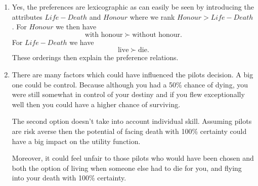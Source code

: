\documentclass[a4paper]{article}
\begin{document}
\begin{exercise}{9}
\begin{enumerate}[label=(\alph*)]
      \item Yes, the preferences are lexicographic as can easily be seen by introducing the attributes $ Life-Death $ and $ Honour $ where we rank $ Honour > Life-Death $. For $ Honour $ we then have
        \begin{equation*}
          \text{with honour} \succ \text{without honour}
        .\end{equation*}
        For $ Life-Death $ we have
        \begin{equation*}
          \text{live} \succ \text{die}
        .\end{equation*}
        These orderings then explain the preference relations.

      \item There are many factors which could have influenced the pilots decision. A big one could be control. Because although you had a 50\% chance of dying, you were still somewhat in control of your destiny and if you flew exceptionally well then you could have a higher chance of surviving.

        The second option doesn't take into account individual skill. Assuming pilots are risk averse then the potential of facing death with 100\% certainty could have a big impact on the utility function.

        Moreover, it could feel unfair to those pilots who would have been chosen and both the option of living when someone else had to die for you, and flying into your death with 100\% certainty.
    \end{enumerate}
  \end{exercise}
\end{document}
